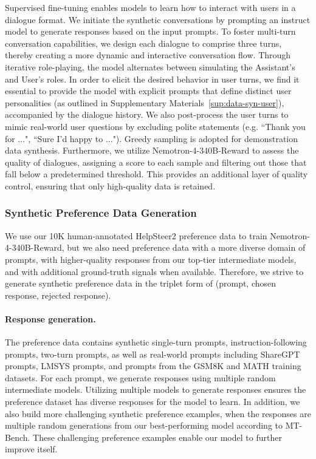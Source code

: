 \documentclass[11pt]{article}
\newcommand{\oursrm}{Nemotron-4-340B-Reward}
\begin{document}
Supervised fine-tuning enables models to learn how to interact with users in a dialogue format. We initiate the synthetic conversations by prompting an instruct model to generate responses based on the input prompts. To foster multi-turn conversation capabilities, we design each dialogue to comprise three turns, thereby creating a more dynamic and interactive conversation flow. Through iterative role-playing, the model alternates between simulating the Assistant's and User's roles. In order to elicit the desired behavior in user turns, we find it essential to provide the model with explicit prompts that define distinct user personalities (as outlined in Supplementary Materials~\ref{sup:data-syn-user}), accompanied by the dialogue history. We also post-process the user turns to mimic real-world user questions by excluding polite statements (e.g. ``Thank you for ...", ``Sure I'd happy to ..."). Greedy sampling is adopted for demonstration data synthesis.
Furthermore, we utilize \oursrm{} to assess the quality of dialogues, assigning a score to each sample and filtering out those that fall below a predetermined threshold. This provides an additional layer of quality control, ensuring that only high-quality data is retained.





\subsubsection{Synthetic Preference Data Generation}\label{subsec:synth-pref-data}
We use our 10K human-annotated HelpSteer2 preference data to train \oursrm{}, but we also need preference data with a more diverse domain of prompts, with higher-quality responses from our top-tier intermediate models, and with additional ground-truth signals when available. Therefore, we strive to generate synthetic preference data in the triplet form of (prompt, chosen response, rejected response).

\paragraph{Response generation.} The preference data contains synthetic single-turn prompts, instruction-following prompts, two-turn prompts, as well as real-world prompts including ShareGPT prompts, LMSYS prompts, and prompts from the GSM8K \citep{cobbe2021} and MATH \citep{hendrycks2021measuring} training datasets. For each prompt, we generate responses using multiple random intermediate models. Utilizing multiple models to generate responses ensures the preference dataset has diverse responses for the model to learn. In addition, we also build more challenging synthetic preference examples, when the responses are multiple random generations from our best-performing model according to MT-Bench. These challenging preference examples enable our model to further improve itself.
\end{document}
